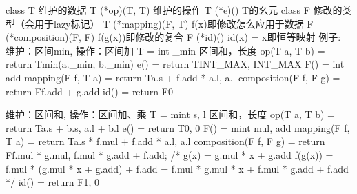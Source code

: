 class T 维护的数据    T (*op)(T, T) 维护的操作   T (*e)() T的幺元    class F 修改的类型（会用于lazy标记）
T (*mapping)(F, T) f(x)即修改怎么应用于数据    F (*composition)(F, F) f(g(x))即修改的复合    F (*id)() id(x) = x即恒等映射
例子:
维护：区间min, 操作：区间加
T = {int _min} 区间和，长度
op(T a, T b) = return T{min(a._min, b._min)}
e() = return T{INT_MAX, INT_MAX}
F() = {int add}
mapping(F f, T a) = return T{a.s + f.add * a.l, a.l}
composition(F f, F g) = return F{f.add + g.add}
id() = return F{0}

维护：区间和, 操作：区间加、乘
T = {mint s, l} 区间和，长度
op(T a, T b) = return T{a.s + b.s, a.l + b.l}
e() = return T{0, 0}
F() = {mint mul, add}
mapping(F f, T a) = return T{a.s * f.mul + f.add * a.l, a.l}
composition(F f, F g) = return F{f.mul * g.mul, f.mul * g.add + f.add};
/*
g(x) = g.mul * x + g.add
f(g(x)) = f.mul * (g.mul * x + g.add) + f.add = f.mul * g.mul * x + f.mul * g.add + f.add
*/
id() = return F{1, 0}